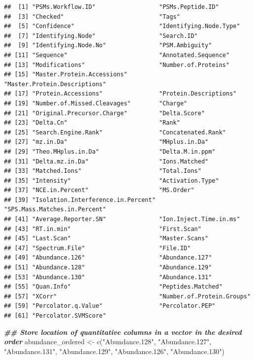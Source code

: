\documentclass[9pt,a4paper,]{extarticle}
\newenvironment{Shaded}{\begin{snugshade}}{\end{snugshade}}
\newcommand{\DocumentationTok}[1]{\textcolor[rgb]{0.56,0.35,0.01}{\textbf{\textit{#1}}}}
\newcommand{\FunctionTok}[1]{\textcolor[rgb]{0.00,0.00,0.00}{#1}}
\newcommand{\NormalTok}[1]{#1}
\newcommand{\OtherTok}[1]{\textcolor[rgb]{0.56,0.35,0.01}{#1}}
\newcommand{\StringTok}[1]{\textcolor[rgb]{0.31,0.60,0.02}{#1}}
\begin{document}
\begin{verbatim}
##  [1] "PSMs.Workflow.ID"                  "PSMs.Peptide.ID"                  
##  [3] "Checked"                           "Tags"                             
##  [5] "Confidence"                        "Identifying.Node.Type"            
##  [7] "Identifying.Node"                  "Search.ID"                        
##  [9] "Identifying.Node.No"               "PSM.Ambiguity"                    
## [11] "Sequence"                          "Annotated.Sequence"               
## [13] "Modifications"                     "Number.of.Proteins"               
## [15] "Master.Protein.Accessions"         "Master.Protein.Descriptions"      
## [17] "Protein.Accessions"                "Protein.Descriptions"             
## [19] "Number.of.Missed.Cleavages"        "Charge"                           
## [21] "Original.Precursor.Charge"         "Delta.Score"                      
## [23] "Delta.Cn"                          "Rank"                             
## [25] "Search.Engine.Rank"                "Concatenated.Rank"                
## [27] "mz.in.Da"                          "MHplus.in.Da"                     
## [29] "Theo.MHplus.in.Da"                 "Delta.M.in.ppm"                   
## [31] "Delta.mz.in.Da"                    "Ions.Matched"                     
## [33] "Matched.Ions"                      "Total.Ions"                       
## [35] "Intensity"                         "Activation.Type"                  
## [37] "NCE.in.Percent"                    "MS.Order"                         
## [39] "Isolation.Interference.in.Percent" "SPS.Mass.Matches.in.Percent"      
## [41] "Average.Reporter.SN"               "Ion.Inject.Time.in.ms"            
## [43] "RT.in.min"                         "First.Scan"                       
## [45] "Last.Scan"                         "Master.Scans"                     
## [47] "Spectrum.File"                     "File.ID"                          
## [49] "Abundance.126"                     "Abundance.127"                    
## [51] "Abundance.128"                     "Abundance.129"                    
## [53] "Abundance.130"                     "Abundance.131"                    
## [55] "Quan.Info"                         "Peptides.Matched"                 
## [57] "XCorr"                             "Number.of.Protein.Groups"         
## [59] "Percolator.q.Value"                "Percolator.PEP"                   
## [61] "Percolator.SVMScore"
\end{verbatim}

\begin{Shaded}
\begin{Highlighting}[]
\DocumentationTok{\#\# Store location of quantitative columns in a vector in the desired order}
\NormalTok{abundance\_ordered }\OtherTok{\textless{}{-}} \FunctionTok{c}\NormalTok{(}\StringTok{"Abundance.128"}\NormalTok{,}
                       \StringTok{"Abundance.127"}\NormalTok{,}
                       \StringTok{"Abundance.131"}\NormalTok{,}
                       \StringTok{"Abundance.129"}\NormalTok{,}
                       \StringTok{"Abundance.126"}\NormalTok{,}
                       \StringTok{"Abundance.130"}\NormalTok{)}
\end{Highlighting}
\end{Shaded}
\end{document}
